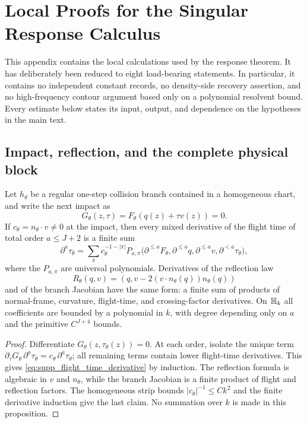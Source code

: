 \section{Local Proofs for the Singular Response Calculus}
\label{app:local_singular_response_proofs}

This appendix contains the local calculations used by the response theorem.
It has deliberately been reduced to eight load-bearing statements.  In
particular, it contains no independent constant records, no density-side
recovery assertion, and no high-frequency contour argument based only on a
polynomial resolvent bound.  Every estimate below states its input, output,
and dependence on the hypotheses in the main text.

\subsection{Impact, reflection, and the complete physical block}

\begin{proposition}
\label{prop:supp_local_impact_reflection_differentiation}
Let \(h_\theta\) be a regular one-step collision branch contained in a
homogeneous chart, and write the next impact as
\[
  G_\theta(z,\tau)
  =F_\theta(q(z)+\tau v(z))=0.
\]
If \(c_\theta=n_\theta\cdot v\ne0\) at the impact, then every mixed derivative
of the flight time of total order \(a\le J+2\) is a finite sum
\begin{equation}
\label{eq:supp_flight_time_derivative}
  \partial^a\tau_\theta
  =
  \sum_{\pi}
  c_\theta^{-1-|\pi|}
  P_{a,\pi}\bigl(
    \partial^{\le a}F_\theta,
    \partial^{\le a}q,
    \partial^{\le a}v,
    \partial^{<a}\tau_\theta
  \bigr),
\end{equation}
where the \(P_{a,\pi}\) are universal polynomials.  Derivatives of the
reflection law
\[
  R_\theta(q,v)
   =(q,v-2(v\cdot n_\theta(q))n_\theta(q))
\]
and of the branch Jacobian have the same form: a finite sum of products of
normal-frame, curvature, flight-time, and crossing-factor derivatives.  On
\(\mathbb H_k\) all coefficients are bounded by a polynomial in \(k\), with
degree depending only on \(a\) and the primitive \(C^{J+4}\) bounds.
\end{proposition}

\begin{proof}
Differentiate \(G_\theta(z,\tau_\theta(z))=0\).  At each order, isolate the
unique term
\(\partial_\tau G_\theta\,\partial^a\tau_\theta
  =c_\theta\,\partial^a\tau_\theta\);
all remaining terms contain lower flight-time derivatives.  This gives
\eqref{eq:supp_flight_time_derivative} by induction.  The reflection formula
is algebraic in \(v\) and \(n_\theta\), while the branch Jacobian is a finite
product of flight and reflection factors.  The homogeneous strip bounds
\(|c_\theta|^{-1}\le Ck^2\) and the finite derivative induction give the last
claim.  No summation over \(k\) is made in this proposition.
\end{proof}

